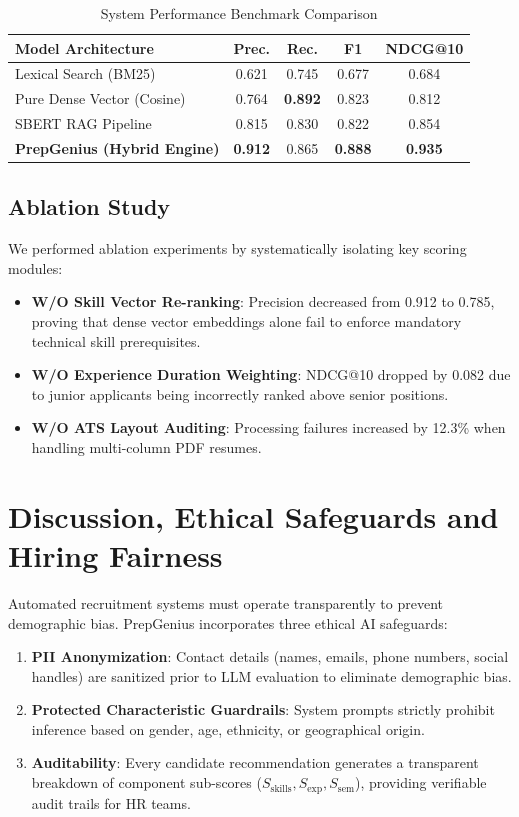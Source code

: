 \documentclass[conference]{IEEEtran}
\begin{document}
\begin{table}[htbp]
\caption{System Performance Benchmark Comparison}
\label{tab:benchmark}
\begin{center}
\begin{tabular}{lcccc}
\toprule
\textbf{Model Architecture} & \textbf{Prec.} & \textbf{Rec.} & \textbf{F1} & \textbf{NDCG@10} \\
\midrule
Lexical Search (BM25) & 0.621 & 0.745 & 0.677 & 0.684 \\
Pure Dense Vector (Cosine) & 0.764 & \textbf{0.892} & 0.823 & 0.812 \\
SBERT RAG Pipeline & 0.815 & 0.830 & 0.822 & 0.854 \\
\textbf{PrepGenius (Hybrid Engine)} & \textbf{0.912} & 0.865 & \textbf{0.888} & \textbf{0.935} \\
\bottomrule
\end{tabular}
\end{center}
\end{table}

\subsection{Ablation Study}
We performed ablation experiments by systematically isolating key scoring modules:
\begin{itemize}
    \item \textbf{W/O Skill Vector Re-ranking}: Precision decreased from 0.912 to 0.785, proving that dense vector embeddings alone fail to enforce mandatory technical skill prerequisites.
    \item \textbf{W/O Experience Duration Weighting}: NDCG@10 dropped by 0.082 due to junior applicants being incorrectly ranked above senior positions.
    \item \textbf{W/O ATS Layout Auditing}: Processing failures increased by 12.3\% when handling multi-column PDF resumes.
\end{itemize}

\section{Discussion, Ethical Safeguards and Hiring Fairness}
Automated recruitment systems must operate transparently to prevent demographic bias. PrepGenius incorporates three ethical AI safeguards:
\begin{enumerate}
    \item \textbf{PII Anonymization}: Contact details (names, emails, phone numbers, social handles) are sanitized prior to LLM evaluation to eliminate demographic bias.
    \item \textbf{Protected Characteristic Guardrails}: System prompts strictly prohibit inference based on gender, age, ethnicity, or geographical origin.
    \item \textbf{Auditability}: Every candidate recommendation generates a transparent breakdown of component sub-scores ($S_{\text{skills}}, S_{\text{exp}}, S_{\text{sem}}$), providing verifiable audit trails for HR teams.
\end{enumerate}
\end{document}
